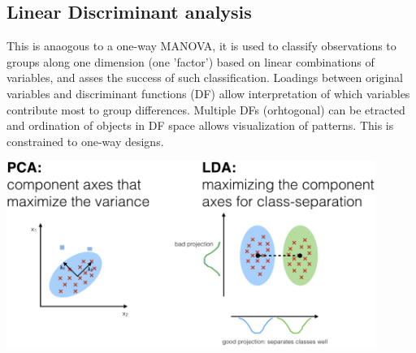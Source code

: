 \documentclass{article}
\begin{document}
\subsection{Linear Discriminant analysis}
This is anaogous to a one-way MANOVA, it is used to classify observations to groups along one dimension (one 'factor') based on linear combinations of variables, and asses the success of such classification. Loadings between original variables and discriminant functions (DF) allow interpretation of which variables contribute most to group differences. Multiple DFs (orhtogonal) can be etracted and ordination of objects in DF space allows visualization of patterns. This is constrained to one-way designs.

\begin{center}
    \includegraphics[width = 0.9\textwidth]{PCA/pca-vs-lda.png}
\end{center}
\end{document}
